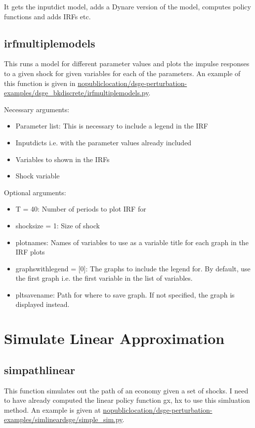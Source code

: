 \documentclass{article}
\theoremstyle{definition}
\begin{document}
It gets the inputdict model, adds a Dynare version of the model, computes policy functions and adds IRFs etc.

\subsection{irfmultiplemodels}
This runs a model for different parameter values and plots the impulse responses to a given shock for given variables for each of the parameters. An example of this function is given in \url{nopubliclocation/dsge-perturbation-examples/dsge_bkdiscrete/irfmultiplemodels.py}. 

Necessary arguments:
\begin{itemize}
    \item Parameter list: This is necessary to include a legend in the IRF
    \item Inputdicts i.e. with the parameter values already included
    \item Variables to shown in the IRFs
    \item Shock variable
\end{itemize}

Optional arguments:
\begin{itemize}
    \item T = 40: Number of periods to plot IRF for
    \item shocksize = 1: Size of shock
    \item plotnames: Names of variables to use as a variable title for each graph in the IRF plots
    \item graphswithlegend = [0]: The graphs to include the legend for. By default, use the first graph i.e. the first variable in the list of variables.
    \item pltsavename: Path for where to save graph. If not specified, the graph is displayed instead.
\end{itemize}

\section{Simulate Linear Approximation}
\subsection{simpathlinear}
This function simulates out the path of an economy given a set of shocks. I need to have already computed the linear policy function gx, hx to use this simluation method. An example is given at \url{nopubliclocation/dsge-perturbation-examples/simlineardsge/simple_sim.py}.
\end{document}
